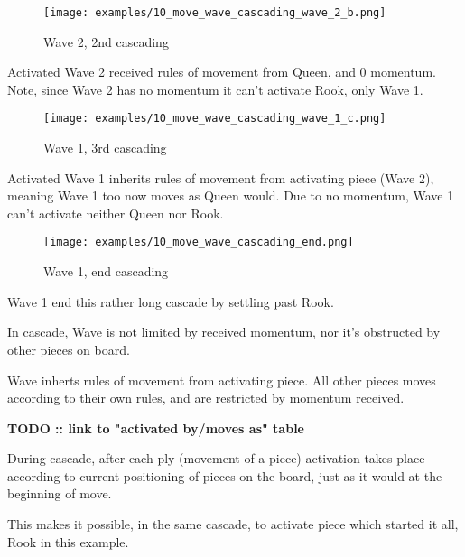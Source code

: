 \clearpage %

\noindent
\begin{wrapfigure}[7]{l}{0.5625\textwidth}
\texttt{[image: examples/10\_move\_wave\_cascading\_wave\_2\_b.png]}
\caption{Wave 2, 2nd cascading}
\label{fig:10_move_wave_cascading_wave_2_b}
\end{wrapfigure}
Activated Wave 2 received rules of movement from Queen, and 0 momentum.
Note, since Wave 2 has no momentum it can't activate Rook, only Wave 1.

\vspace*{0.245\textheight}
\noindent
\begin{wrapfigure}[9]{r}{0.5625\textwidth}
\texttt{[image: examples/10\_move\_wave\_cascading\_wave\_1\_c.png]}
\caption{Wave 1, 3rd cascading}
\label{fig:10_move_wave_cascading_wave_1_c}
\end{wrapfigure}
Activated Wave 1 inherits rules of movement from activating piece (Wave 2),
meaning Wave 1 too now moves as Queen would. Due to no momentum, Wave 1 can't
activate neither Queen nor Rook.

\clearpage %

\noindent
\begin{wrapfigure}[3]{l}{0.5625\textwidth}
\texttt{[image: examples/10\_move\_wave\_cascading\_end.png]}
\caption{Wave 1, end cascading}
\label{fig:10_move_wave_cascading_end}
\end{wrapfigure}
Wave 1 end this rather long cascade by settling past Rook.

\vspace*{0.345\textheight}
In cascade, Wave is not limited by received momentum, nor it's obstructed by
other pieces on board.

Wave inherts rules of movement from activating piece. All other pieces moves
according to their own rules, and are restricted by momentum received.

\textbf{\huge{TODO :: link to "activated by/moves as" table}} %

During cascade, after each ply (movement of a piece) activation takes place
according to current positioning of pieces on the board, just as it would
at the beginning of move.

This makes it possible, in the same cascade, to activate piece which started
it all, Rook in this example.

